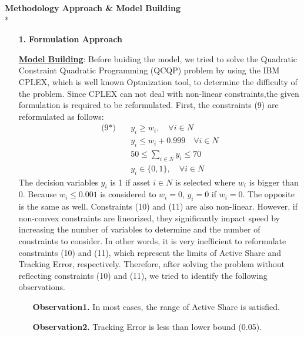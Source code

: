 \documentclass[11pt]{article}
\begin{document}
\textbf{Methodology Approach {\&} Model Building}\\*
\begin{itemize}

\item[\textbf{1.}] \textbf{Formulation Approach}
	\item[] \underline{\textbf{Model Building}}:
	Before buiding the model, we tried to solve the  Quadratic Constraint Quadratic Programming (QCQP)  problem by using the IBM CPLEX, which is well known Optmization tool, to determine the difficulty of the problem. Since CPLEX can not deal with non-linear constraints,the given formulation is required to be reformulated. 
	First, the constraints (9) are reformulated as follows:
	\begin{align*}
	\text{(9*)} \quad
	& y_i \geq w_i, \quad \forall i \in N \\
	& y_i \leq w_i + 0.999 \quad \forall i \in N \\
	& 50 \leq \sum_{i \in N} y_i \leq 70 \\
	& y_i \in \{0,1\}, \quad \forall i \in N 
	\end{align*}
	The decision variables $y_i$ is 1 if asset $i \in N$ is selected where $w_i$ is bigger than 0. Because $w_i \leq 0.001$ is considered to $w_i = 0$,  $y_i = 0$ if $w_i = 0$. The opposite is the same as well. Constraints (10) and (11) are also non-linear. However, if non-convex constraints are linearized, they significantly impact speed by increasing the number of variables to determine and the number of constraints to consider. In other words, it is very inefficient to reformulate constraints (10) and (11), which represent the limits of Active Share and Tracking Error, respectively. Therefore, after solving the problem without reflecting constraints (10) and (11), we tried to identify the following observations.
	\begin{itemize}
		\item[] \textbf{Observation1.} In most cases, the range of Active Share is satisfied.
		\item[] \textbf{Observation2.} Tracking Error is less than lower bound (0.05).
	\end{itemize}

\end{itemize}
\end{document}

